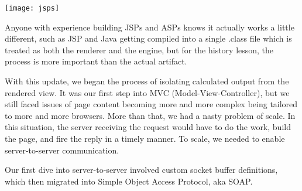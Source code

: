 \texttt{[image: jsps]}

Anyone with experience building JSPs and ASPs knows it actually works a little different, such as JSP and Java getting compiled into a single .class file which is treated as both the renderer and the engine, but for the history lesson, the process is more important than the actual artifact.

With this update, we began the process of isolating calculated output from the rendered view.  It was our first step into MVC (Model-View-Controller), but we still faced issues of page content becoming more and more complex being tailored to more and more browsers.  More than that, we had a nasty problem of scale.  In this situation, the server receiving the request would have to do the work, build the page, and fire the reply in a timely manner.  To scale, we needed to enable server-to-server communication.

Our first dive into server-to-server involved custom socket buffer definitions, which then migrated into Simple Object Access Protocol, aka SOAP.

